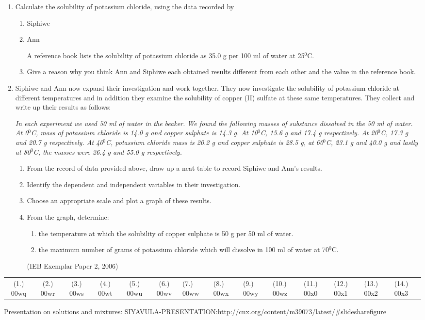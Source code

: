 {\begin{enumerate}
\item{Calculate the solubility of potassium chloride, using the data recorded by}
\begin{enumerate}
\item{Siphiwe}
\item{Ann}


A reference book lists the solubility of potassium chloride as 35.0 g per 100 ml of water at 25$^{0}$C.
\item{Give a reason why you think Ann and Siphiwe each obtained results different from each other and the value in the reference book.}
\end{enumerate}

\item{Siphiwe and Ann now expand their investigation and work together. They now investigate the solubility of potassium chloride at different temperatures and in addition they examine the solubility of copper (II) sulfate at these same temperatures. They collect and write up their results as follows:}

\textit{In each experiment we used 50 ml of water in the beaker. We found the following masses of substance dissolved  in the 50 ml of water. At 0$^{0}$C, mass of potassium chloride is 14.0 g and copper sulphate is 14.3 g. At 10$^{0}$C, 15.6 g and 17.4 g respectively. At 20$^{0}$C, 17.3 g and 20.7 g respectively. At 40$^{0}$C, potassium chloride mass is 20.2 g and copper sulphate is 28.5 g, at 60$^{0}$C, 23.1 g and 40.0 g and lastly at 80$^{0}$C, the masses were 26.4 g and 55.0 g respectively.}

\begin{enumerate}
\item{From the record of data provided above, draw up a neat table to record Siphiwe and Ann's results.}
\item{Identify the dependent and independent variables in their investigation.}
\item{Choose an appropriate scale and plot a graph of these results.}
\item{From the graph, determine:}
\begin{enumerate}
\item{the temperature at which the solubility of copper sulphate is 50 g per 50 ml of water.}
\item{the maximum number of grams of potassium chloride which will dissolve in 100 ml of water at 70$^{0}$C.}
\end{enumerate}
(IEB Exemplar Paper 2, 2006)
\end{enumerate}
\end{enumerate}
\practiceinfo

\begin{tabular}[h]{cccccc}
(1.) 00wq & (2.) 00wr & (3.) 00ws & (4.) 00wt & (5.) 00wu & (6.) 00wv & (7.) 00ww & (8.) 00wx & (9.) 00wy & (10.) 00wz & (11.) 00x0 & (12.) 00x1 & (13.) 00x2 & (14.) 00x3 & 
 \end{tabular}
}Presentation on solutions and mixtures: SIYAVULA-PRESENTATION:http://cnx.org/content/m39073/latest/#slidesharefigure

